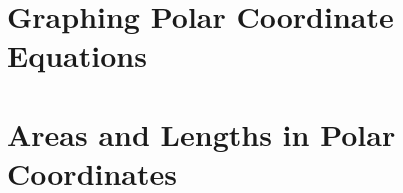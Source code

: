 \documentclass{report}
\begin{document}
\section{Graphing Polar Coordinate Equations }
\begin{quote}

\end{quote}


\section{Areas and Lengths in Polar Coordinates  }
\begin{quote}

\end{quote}
\end{document}
